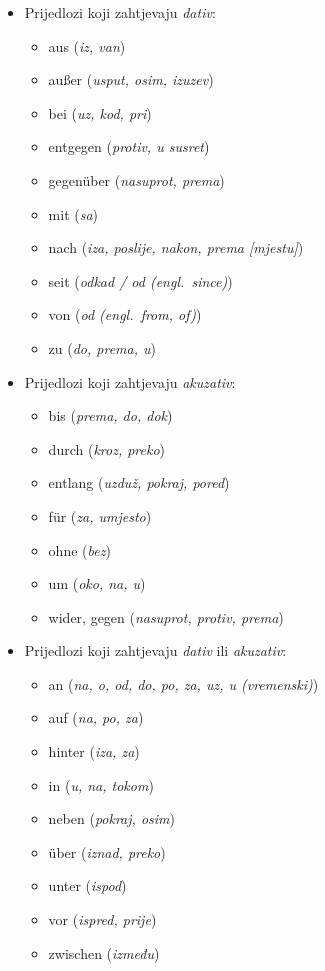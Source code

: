 \documentclass[12pt,german]{article}
\newcommand{\prijevod}[2]{\item #1 (\emph{#2})}
\begin{document}
\begin{multicols}{2}
\begin{itemize}
  \item Prijedlozi koji zahtjevaju \emph{dativ}:
  \begin{itemize}[nolistsep, label={}]
      \prijevod{aus}{iz, van}
      \prijevod{au{\ss}er}{usput, osim, izuzev}
      \prijevod{bei}{uz, kod, pri}
      \prijevod{entgegen}{protiv, u susret}
      \prijevod{gegen\"uber}{nasuprot, prema}
      \prijevod{mit}{sa}
      \prijevod{nach}{iza, poslije, nakon, prema [mjestu]}
      \prijevod{seit}{odkad / od (engl.\ \emph{since})}
      \prijevod{von}{od (engl.\ \emph{from, of})}
      \prijevod{zu}{do, prema, u}
  \end{itemize}

  \item Prijedlozi koji zahtjevaju \emph{akuzativ}:
  \begin{itemize}[nolistsep, label={}]
      \prijevod{bis}{prema, do, dok}
      \prijevod{durch}{kroz, preko}
      \prijevod{entlang}{uzduž, pokraj, pored}
      \prijevod{f\"ur}{za, umjesto}
      \prijevod{ohne}{bez}
      \prijevod{um}{oko, na, u}
      \prijevod{wider, gegen}{nasuprot, protiv, prema}
  \end{itemize}

  \item Prijedlozi koji zahtjevaju \emph{dativ} ili \emph{akuzativ}:
  \begin{itemize}[nolistsep, label={}]
      \prijevod{an}{na, o, od, do, po, za, uz, u (vremenski)}
      \prijevod{auf}{na, po, za}
      \prijevod{hinter}{iza, za}
      \prijevod{in}{u, na, tokom}
      \prijevod{neben}{pokraj, osim}
      \prijevod{\"uber}{iznad, preko}
      \prijevod{unter}{ispod}
      \prijevod{vor}{ispred, prije}
      \prijevod{zwischen}{između}
  \end{itemize}
\end{itemize}


% 

\end{multicols}
\end{document}
